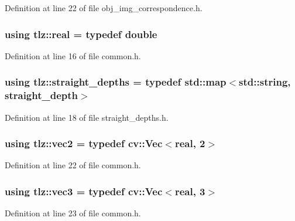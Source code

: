 Definition at line 22 of file obj\+\_\+img\+\_\+correspondence.\+h.

\subsubsection[{\texorpdfstring{real}{real}}]{\setlength{\rightskip}{0pt plus 5cm}using {\bf tlz\+::real} = typedef double}\hypertarget{namespacetlz_a15fd37cce97f2b8b606af18c2615f602}{}\label{namespacetlz_a15fd37cce97f2b8b606af18c2615f602}


Definition at line 16 of file common.\+h.

\subsubsection[{\texorpdfstring{straight\+\_\+depths}{straight_depths}}]{\setlength{\rightskip}{0pt plus 5cm}using {\bf tlz\+::straight\+\_\+depths} = typedef std\+::map$<$std\+::string, {\bf straight\+\_\+depth}$>$}\hypertarget{namespacetlz_a392186cdaba07f801aec55b464ccbc0b}{}\label{namespacetlz_a392186cdaba07f801aec55b464ccbc0b}


Definition at line 18 of file straight\+\_\+depths.\+h.

\subsubsection[{\texorpdfstring{vec2}{vec2}}]{\setlength{\rightskip}{0pt plus 5cm}using {\bf tlz\+::vec2} = typedef cv\+::\+Vec$<${\bf real}, 2$>$}\hypertarget{namespacetlz_ae192989bfbe6c700ac84d2a8cf05ebb4}{}\label{namespacetlz_ae192989bfbe6c700ac84d2a8cf05ebb4}


Definition at line 22 of file common.\+h.

\subsubsection[{\texorpdfstring{vec3}{vec3}}]{\setlength{\rightskip}{0pt plus 5cm}using {\bf tlz\+::vec3} = typedef cv\+::\+Vec$<${\bf real}, 3$>$}\hypertarget{namespacetlz_ad0646d752ddb9d40d702d40cc6dc54a1}{}\label{namespacetlz_ad0646d752ddb9d40d702d40cc6dc54a1}


Definition at line 23 of file common.\+h.

